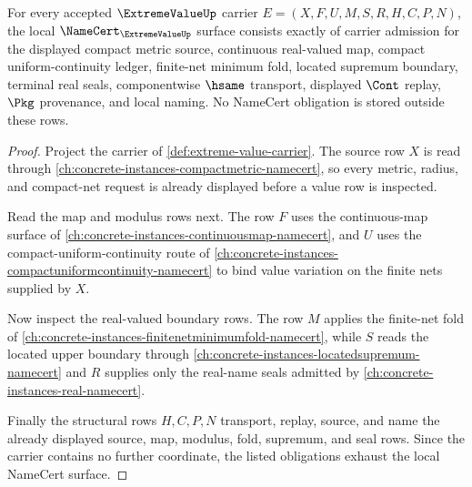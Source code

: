 \begin{theorem}
\label{thm:extreme-value-namecert-obligations}
For every accepted $\ExtremeValueUp$ carrier $E=(X,F,U,M,S,R,H,C,P,N)$, the local $\NameCert_{\ExtremeValueUp}$ surface consists exactly of carrier admission for the displayed compact metric source, continuous real-valued map, compact uniform-continuity ledger, finite-net minimum fold, located supremum boundary, terminal real seals, componentwise $\hsame$ transport, displayed $\Cont$ replay, $\Pkg$ provenance, and local naming. No NameCert obligation is stored outside these rows.
\end{theorem}
\begin{proof}
Project the carrier of \autoref{def:extreme-value-carrier}. The source row $X$ is read through \autoref{ch:concrete-instances-compactmetric-namecert}, so every metric, radius, and compact-net request is already displayed before a value row is inspected.

Read the map and modulus rows next. The row $F$ uses the continuous-map surface of \autoref{ch:concrete-instances-continuousmap-namecert}, and $U$ uses the compact-uniform-continuity route of \autoref{ch:concrete-instances-compactuniformcontinuity-namecert} to bind value variation on the finite nets supplied by $X$.

Now inspect the real-valued boundary rows. The row $M$ applies the finite-net fold of \autoref{ch:concrete-instances-finitenetminimumfold-namecert}, while $S$ reads the located upper boundary through \autoref{ch:concrete-instances-locatedsupremum-namecert} and $R$ supplies only the real-name seals admitted by \autoref{ch:concrete-instances-real-namecert}.

Finally the structural rows $H,C,P,N$ transport, replay, source, and name the already displayed source, map, modulus, fold, supremum, and seal rows. Since the carrier contains no further coordinate, the listed obligations exhaust the local NameCert surface.
\end{proof}

